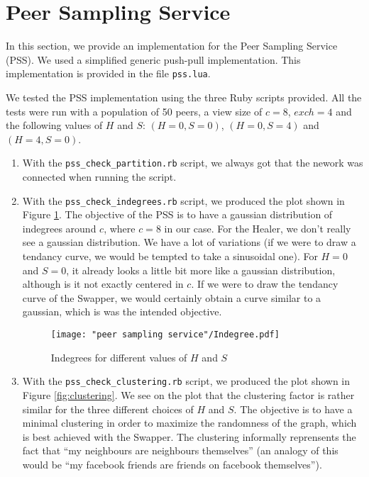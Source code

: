 \documentclass[a4paper, 11pt]{article}
\theoremstyle{plain}
\theoremstyle{definition}
\begin{document}
\section{Peer Sampling Service}
\label{sec:peer-sampling-service}

  In this section, we provide an implementation for the Peer Sampling Service (PSS). We used a simplified
  generic push-pull implementation. This implementation is provided in the file \texttt{pss.lua}. 
  
  We tested the PSS implementation using the three Ruby scripts provided. All the tests were run with a
  population of 50 peers, a view size of $c = 8$, $exch = 4$ and the following values of $H$ and $S$: $(H=0,
  S=0)$, $(H=0, S=4)$ and $(H=4, S=0)$.
  
  \begin{enumerate}
  \item With the \texttt{pss\_check\_partition.rb} script, we always got that the nework was connected when
    running the script.
  \item With the \texttt{pss\_check\_indegrees.rb} script, we produced the plot shown in Figure
    \ref{fig:indegrees}. The objective of the PSS is to have a gaussian distribution of indegrees around $c$,
    where $c=8$ in our case. For the Healer, we don't really see a gaussian
    distribution. We have a lot of variations (if we were to draw a tendancy curve, we would be
    tempted to take a sinusoidal one). For $H=0$ and $S=0$, it already looks a little bit more like a gaussian
    distribution, although is it not exactly centered in $c$. If we were to draw the tendancy curve of the
    Swapper, we would certainly obtain a curve similar to a gaussian, which is was the intended objective.

    \begin{figure}[h]
      \centering
      \texttt{[image: "peer sampling service"/Indegree.pdf]}
      \caption{Indegrees for different values of $H$ and $S$}
      \label{fig:indegrees}
    \end{figure}

  \item With the \texttt{pss\_check\_clustering.rb} script, we produced the plot shown in Figure
    \ref{fig:clustering}. We see on the plot that the clustering factor is rather similar for the three
    different choices of $H$ and $S$. The objective is to have a minimal clustering in order to maximize the
    randomness of the graph, which is best achieved with the Swapper. The clustering informally reprensents
    the fact that ``my neighbours are neighbours themselves'' (an analogy of this would be ``my facebook
    friends are friends on facebook themselves''). 



\end{enumerate}
\end{document}
